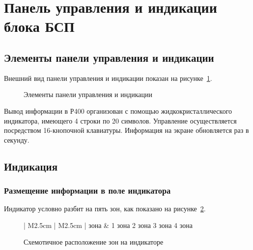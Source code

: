 \section{Панель управления и индикации блока БСП} \label{sec:overview}


\subsection{Элементы панели управления и индикации}

Внешний вид панели управления и индикации показан на рисунке~\ref{fig:pi}.

\begin{figure}[H]
	
	\caption{Элементы панели управления и индикации}
	\label{fig:pi}
\end{figure}

Вывод информации в Р400 организован с помощью жидкокристаллического индикатора, имеющего 4 строки по 20 символов. Управление осуществляется посредством 16-кнопочной клавиатуры. Информация на экране обновляется раз в секунду.


\subsection{Индикация} 


\subsubsection{Размещение информации в поле индикатора}

Индикатор условно разбит на пять зон, как показано на рисунке~\ref{fig:overview_ind}.

\begin{figure}[H]
	\centering
	
	\begin{tabular}{| M{2.5cm} | M{2.5cm} |}	
		 зона	& 1 зона 				\tabularnewline \hline 
	     {2 зона}	\tabularnewline \hline
	     {3 зона}	\tabularnewline \hline
	     {4 зона}	\tabularnewline 
	    \lasthline 
	\end{tabular} 
	
	\caption{Схемотичное расположение зон на индикаторе} 
	\label{fig:overview_ind}
\end{figure}

